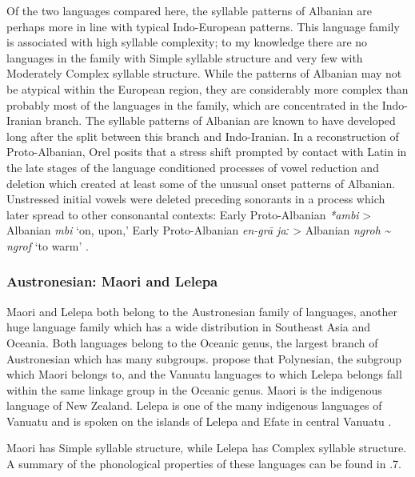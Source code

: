   Of the two languages compared here, the syllable patterns of Albanian are perhaps more in line with typical Indo-European patterns. This language family is associated with high syllable complexity; to my knowledge there are no languages in the family with Simple syllable structure and very few with Moderately Complex syllable structure. While the patterns of Albanian may not be atypical within the European region, they are considerably more complex than probably most of the languages in the family, which are concentrated in the Indo-Iranian branch. The syllable patterns of Albanian are known to have developed long after the split between this branch and Indo-Iranian. In a reconstruction of Proto-Albanian, Orel posits that a stress shift prompted by contact with Latin in the late stages of the language conditioned processes of vowel reduction and deletion which created at least some of the unusual onset patterns of Albanian. Unstressed initial vowels were deleted preceding sonorants in a process which later spread to other consonantal contexts: Early Proto-Albanian \textit{*ambi} > Albanian \textit{mbi} ‘on, upon,’ Early Proto-Albanian \textit{en-gra\={} jaː} > Albanian \textit{ngroh} \textit{{\textasciitilde} ngrof} ‘to warm’ \citep[22]{Orel2000}.

\subsubsection{{Austronesian:} {Maori} {and} {Lelepa}}\label{sec:8.4.3.6}

  Maori and Lelepa both belong to the Austronesian family of languages, another huge language family which has a wide distribution in Southeast Asia and Oceania. Both languages belong to the Oceanic genus, the largest branch of Austronesian which has many subgroups. \citet{LynchEtAl2002} propose that Polynesian, the subgroup which Maori belongs to, and the Vanuatu languages to which Lelepa belongs fall within the same linkage group in the Oceanic genus. Maori is the indigenous language of New Zealand. Lelepa is one of the many indigenous languages of Vanuatu and is spoken on the islands of Lelepa and Efate in central Vanuatu \citep{Lacrampe2014}.

  Maori has Simple syllable structure, while Lelepa has Complex syllable structure. A summary of the phonological properties of these languages can be found in .7.


